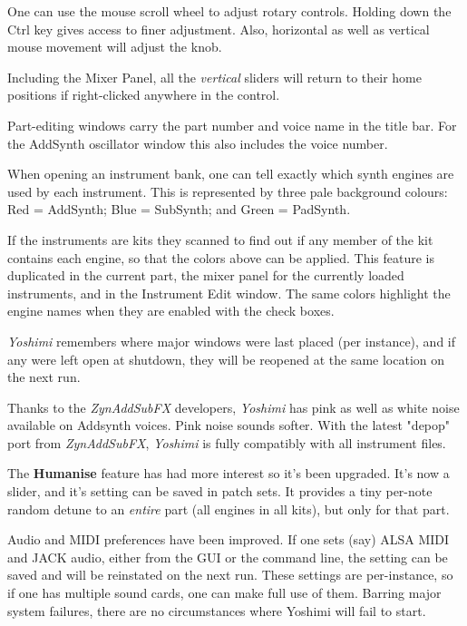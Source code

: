 \documentclass[
 11pt,
 twoside,
 a4paper,
 final                                 %
]{article}
\begin{document}
   One can use the mouse scroll wheel to adjust rotary controls. Holding
   down the Ctrl key gives access to finer adjustment.  Also, horizontal as
   well as vertical mouse movement will adjust the knob.

   Including the Mixer Panel, all the \textsl{vertical} sliders will return to
   their home positions if right-clicked anywhere in the control.

   Part-editing windows carry the part number and voice name in the title bar.
   For the AddSynth oscillator window this also includes the voice number.

   When opening an instrument bank, one can tell exactly which synth
   engines are used by each instrument. This is represented by three pale
   background colours: Red = AddSynth; Blue = SubSynth; and Green = PadSynth.

   If the instruments are kits they scanned to find out if any member of the
   kit contains each engine, so that the colors above can be applied.
   This feature is duplicated in the current part, the mixer panel for the
   currently loaded instruments, and in the Instrument Edit window.
   The same colors highlight the engine names when they are enabled with the
   check boxes. 

   \textsl{Yoshimi} remembers where major windows were last placed (per
   instance), and if any were left open at shutdown, they will be reopened at
   the same location on the next run.

   Thanks to the \textsl{ZynAddSubFX} developers, \textsl{Yoshimi} has pink
   as well as white noise available on Addsynth voices. Pink noise sounds
   softer.  With the latest "depop" port from \textsl{ZynAddSubFX},
   \textsl{Yoshimi} is fully compatibly with all instrument files.

   The \textbf{Humanise} feature has had more interest so it's been upgraded.
   It's now a slider, and it's setting can be saved in patch sets. It provides
   a tiny per-note random detune to an \textsl{entire} part (all engines in all
   kits), but only for that part.

   Audio and MIDI preferences have been improved. If one sets (say) ALSA MIDI
   and JACK audio, either from the GUI or the command line, the setting can be
   saved and will be reinstated on the next run. These settings are
   per-instance, so if one has multiple sound cards, one can make full use of
   them.  Barring major system failures, there are no circumstances where
   Yoshimi will fail to start.
\end{document}

